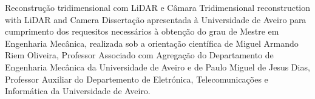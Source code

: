 
\TitlePage
\HEADER{}{\ThesisYear}
      {Reconstrução tridimensional com LiDAR e Câmara}
\TITLE{}
      {Tridimensional reconstruction with LiDAR and Camera}
\vspace*{15mm}
\TEXT{}
     {Dissertação apresentada à Universidade de Aveiro para cumprimento dos requesitos necessários à obtenção do grau de Mestre em Engenharia Mecânica, realizada sob a orientação científica de Miguel Armando Riem Oliveira, Professor Associado com Agregação do Departamento de Engenharia Mecânica da Universidade de Aveiro e de Paulo Miguel de Jesus Dias, Professor Auxiliar do Departemento de Eletrónica, Telecomunicações e Informática da Universidade de Aveiro.}
\EndTitlePage
\titlepage\ \endtitlepage
